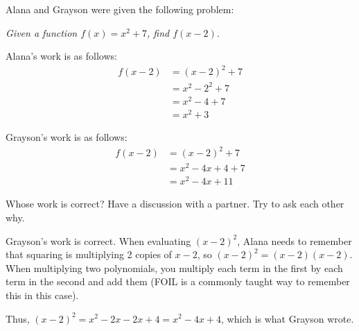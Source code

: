 \documentclass[noauthor]{ximera}
\begin{document}
\begin{problem}
Alana and Grayson were given the following problem:

\textit{Given a function \(f(x) = x^2 + 7\), find \(f(x - 2)\).}

Alana's work is as follows:
    \begin{align*}
        f(x - 2) & = (x - 2)^2 + 7 \\
        & = x^2 - 2^2 + 7 \\
        & = x^2 - 4 + 7 \\
        & = x^2 + 3
    \end{align*}

Grayson's work is as follows:
    \begin{align*}
        f(x - 2) & = (x - 2)^2 + 7 \\
        & = x^2 - 4x + 4 + 7 \\
        & = x^2 - 4x + 11
    \end{align*}

Whose work is correct? Have a discussion with a partner. Try to ask
each other why.
\begin{explanation}
Grayson's work is correct. When evaluating \((x - 2)^2\), Alana needs to 
remember that squaring is multiplying 2 copies of \(x - 2\), so 
\((x - 2)^2 = (x - 2)(x - 2)\). When multiplying two polynomials, you 
multiply each term in the first by each term in the second and add them (FOIL is a
commonly taught way to remember this in this case).

Thus, \((x - 2)^2 = x^2 - 2x - 2x + 4 = x^2 - 4x + 4\), which is what Grayson wrote.
\end{explanation}
\end{problem}
\end{document}
